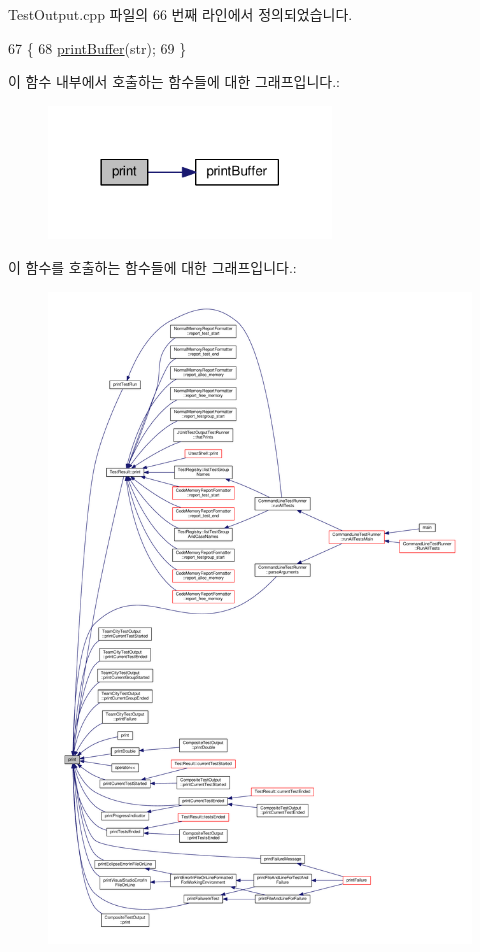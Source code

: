 Test\+Output.\+cpp 파일의 66 번째 라인에서 정의되었습니다.


\begin{DoxyCode}
67 \{
68     \hyperlink{class_test_output_a83ee46e0da3bb079280fc397b48026d8}{printBuffer}(str);
69 \}
\end{DoxyCode}


이 함수 내부에서 호출하는 함수들에 대한 그래프입니다.\+:
\nopagebreak
\begin{figure}[H]
\begin{center}
\leavevmode
\includegraphics[width=213pt]{class_test_output_a321b5c489a90374cb61c34fe5d2253ef_cgraph}
\end{center}
\end{figure}




이 함수를 호출하는 함수들에 대한 그래프입니다.\+:
\nopagebreak
\begin{figure}[H]
\begin{center}
\leavevmode
\includegraphics[width=350pt]{class_test_output_a321b5c489a90374cb61c34fe5d2253ef_icgraph}
\end{center}
\end{figure}


